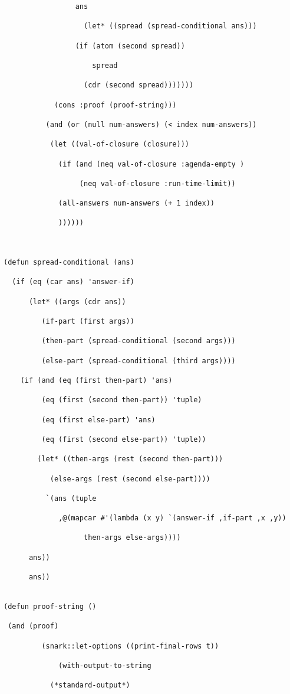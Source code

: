 \begin{lstlisting}
				 ans

			       (let* ((spread (spread-conditional ans)))

				 (if (atom (second spread))

				     spread

				   (cdr (second spread)))))))

		    (cons :proof (proof-string)))

	      (and (or (null num-answers) (< index num-answers))

		   (let ((val-of-closure (closure)))

		     (if (and (neq val-of-closure :agenda-empty )

			      (neq val-of-closure :run-time-limit))			 

			 (all-answers num-answers (+ 1 index))

			 ))))))



(defun spread-conditional (ans)

  (if (eq (car ans) 'answer-if)

      (let* ((args (cdr ans))

	     (if-part (first args))

	     (then-part (spread-conditional (second args)))

	     (else-part (spread-conditional (third args))))

	(if (and (eq (first then-part) 'ans)

		 (eq (first (second then-part)) 'tuple)

		 (eq (first else-part) 'ans)

		 (eq (first (second else-part)) 'tuple))

	    (let* ((then-args (rest (second then-part)))

		   (else-args (rest (second else-part))))

	      `(ans (tuple 

		     ,@(mapcar #'(lambda (x y) `(answer-if ,if-part ,x ,y))

			       then-args else-args))))

	  ans))

      ans))


(defun proof-string ()

 (and (proof)

         (snark::let-options ((print-final-rows t))

             (with-output-to-string

		   (*standard-output*)


\end{lstlisting}
